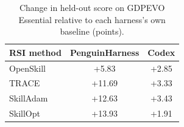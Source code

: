 \begin{table}[!htbp]
  \centering
  \small
  \caption{Change in held-out score on GDPEVO Essential relative to each harness's own baseline (points).}
  \label{tab:cross-harness-rsi}
  \begin{tabular}{@{}lcc@{}}
    \toprule
    \textbf{RSI method} & \textbf{PenguinHarness} & \textbf{Codex} \\
    \midrule
    OpenSkill & +5.83 & +2.85 \\
    TRACE & +11.69 & +3.33 \\
    SkillAdam & +12.63 & +3.43 \\
    SkillOpt & +13.93 & +1.91 \\
    \bottomrule
  \end{tabular}
\end{table}
